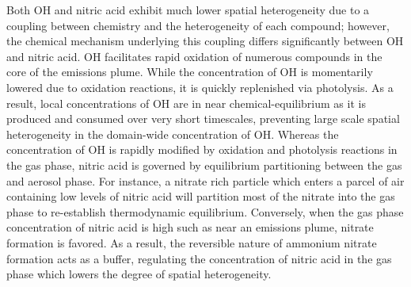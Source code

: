 \documentclass[acp, manuscript]{copernicus}
\begin{document}
Both OH and nitric acid exhibit much lower spatial heterogeneity due to a 
coupling between chemistry and the heterogeneity of each compound; 
however, the chemical mechanism underlying this coupling differs significantly 
between OH and nitric acid. OH facilitates rapid oxidation of numerous compounds
in the core of the emissions plume. While the concentration of OH is momentarily 
lowered due to oxidation reactions, it is quickly replenished via photolysis. 
As a result, local concentrations of OH are in near chemical-equilibrium as
it is produced and consumed over very short timescales, preventing
large scale spatial heterogeneity in the domain-wide concentration of
OH. Whereas the concentration of OH is rapidly modified by oxidation and 
photolysis reactions in the gas phase, nitric acid is governed by equilibrium 
partitioning between the gas and aerosol phase. For instance, a nitrate rich 
particle which enters a parcel of air containing low levels of nitric acid will partition 
most of the nitrate into the gas phase to re-establish thermodynamic equilibrium.
Conversely, when the gas phase concentration of nitric acid is high such as near an 
emissions plume, nitrate formation is favored. As a result, the reversible nature of 
ammonium nitrate formation acts as a buffer, regulating the concentration of nitric acid 
in the gas phase which lowers the degree of spatial heterogeneity.




\end{document}
